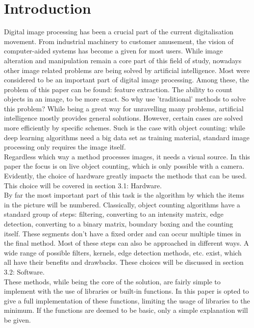 \documentclass{article}
\begin{document}


\newpage
\tableofcontents
{}


\newpage
\listoffigures

\newpage
\section{Introduction}
Digital image processing has been a crucial part of the current digitalisation movement. From industrial machinery to customer amusement, the vision of computer-aided systems has become a given for most users. While image alteration and manipulation remain a core part of this field of study, nowadays other image related problems are being solved by artificial intelligence. Most were considered to be an important part of digital image processing. Among these, the problem of this paper can be found: feature extraction. The ability to count objects in an image, to be more exact. So why use 'traditional' methods to solve this problem? While being a great way for unravelling many problems, artificial intelligence mostly provides general solutions. However, certain cases are solved more efficiently by specific schemes. Such is the case with object counting: while deep learning algorithms need a big data set as training material, standard image processing only requires the image itself.\\
Regardless which way a method processes images, it needs a visual source. In this paper the focus is on live object counting, which is only possible with a camera. Evidently, the choice of hardware greatly impacts the methods that can be used. This choice will be covered in section 3.1: Hardware.\\
By far the most important part of this task is the algorithm by which the items in the picture will be numbered. Classically, object counting algorithms have a standard group of steps: filtering, converting to an intensity matrix, edge detection, converting to a binary matrix, boundary boxing and the counting itself. These segments don't have a fixed order and can occur multiple times in the final method. Most of these steps can also be approached in different ways. A wide range of possible filters, kernels, edge detection methods, etc. exist, which all have their benefits and drawbacks. These choices will be discussed in section 3.2: Software.\\
These methods, while being the core of the solution, are fairly simple to implement with the use of libraries or built-in functions. In this paper is opted to give a full implementation of these functions, limiting the usage of libraries to the minimum. If the functions are deemed to be basic, only a simple explanation will be given.
\end{document}
